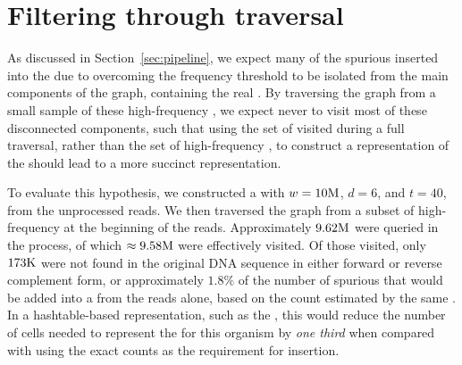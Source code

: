 \section{Filtering through traversal}
\label{sec:results-dbcm-traversal}

As discussed in Section~\ref{sec:pipeline}, we expect many of the spurious  inserted into the \dBG due to overcoming the frequency threshold to be isolated from the main components of the graph, containing the real . By traversing the graph from a small sample of these high-frequency , we expect never to visit most of these disconnected components, such that using the set of  visited during a full traversal, rather than the set of high-frequency , to construct a representation of the \dBG should lead to a more succinct representation.

To evaluate this hypothesis, we constructed a \dBCM with $w = 10\mega$, $d = 6$, and $t = 40$, from the unprocessed reads. We then traversed the graph from a subset of high-frequency  at the beginning of the reads. Approximately $9.62\mega$ \kmers were queried in the process, of which $\approx 9.58\mega$ were effectively visited. Of those visited, only $173\kilo$ were not found in the original DNA sequence in either forward or reverse complement form, or approximately $1.8\%$ of the number of spurious  that would be added into a \dBG from the reads alone, based on the count estimated by the same \dBCM{}. In a hashtable-based representation, such as the \dBHT, this would reduce the number of cells needed to represent the \dBG for this organism by \emph{one third} when compared with using the exact counts as the requirement for insertion.


